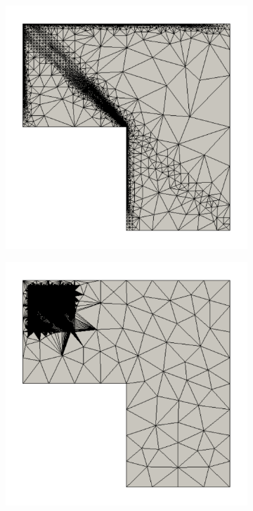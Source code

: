\begin{figure}[hbt!]
\centering
\begin{subfigure}{.3\textwidth}
\centering
\includegraphics[width=.99\linewidth]{img/vms_lshape_square_spr_final}
\end{subfigure}%
\begin{subfigure}{.3\textwidth}
\centering
\includegraphics[width=.99\linewidth]{img/vms_lshape_square_vms1_final}

\end{subfigure}
\end{figure}
